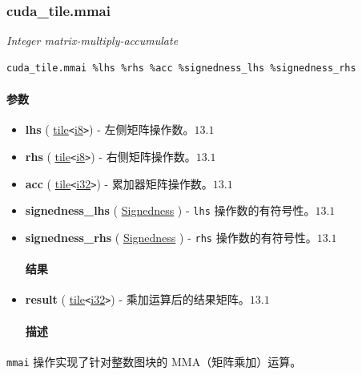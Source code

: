 \documentclass{article}
\begin{document}
\subsubsection{cuda\_tile.mmai}

\textit{Integer matrix-multiply-accumulate}


\begin{lstlisting}
cuda_tile.mmai %lhs %rhs %acc %signedness_lhs %signedness_rhs
\end{lstlisting}

\paragraph{参数}

\begin{itemize}
\item \textbf{lhs} ( \href{https://docs.nvidia.com/cuda/tile-ir/latest/sections/types.html#type-tile}{tile}\texttt{<}\href{https://docs.nvidia.com/cuda/tile-ir/latest/sections/types.html#subsection-element-types}{i8}\texttt{>}) - 左侧矩阵操作数。$\boxed{13.1}$
\item \textbf{rhs} ( \href{https://docs.nvidia.com/cuda/tile-ir/latest/sections/types.html#type-tile}{tile}\texttt{<}\href{https://docs.nvidia.com/cuda/tile-ir/latest/sections/types.html#subsection-element-types}{i8}\texttt{>}) - 右侧矩阵操作数。$\boxed{13.1}$
\item \textbf{acc} ( \href{https://docs.nvidia.com/cuda/tile-ir/latest/sections/types.html#type-tile}{tile}\texttt{<}\href{https://docs.nvidia.com/cuda/tile-ir/latest/sections/types.html#subsection-element-types}{i32}\texttt{>}) - 累加器矩阵操作数。$\boxed{13.1}$
\item \textbf{signedness\_lhs} ( \href{https://docs.nvidia.com/cuda/tile-ir/latest/sections/operations.html#op-attribute-cuda-tile-mmai-signedness-attr}{Signedness} ) - \texttt{lhs} 操作数的有符号性。$\boxed{13.1}$
\item \textbf{signedness\_rhs} ( \href{https://docs.nvidia.com/cuda/tile-ir/latest/sections/operations.html#op-attribute-cuda-tile-mmai-signedness-attr}{Signedness} ) - \texttt{rhs} 操作数的有符号性。$\boxed{13.1}$


\paragraph{结果}

\item \textbf{result} ( \href{https://docs.nvidia.com/cuda/tile-ir/latest/sections/types.html#type-tile}{tile}\texttt{<}\href{https://docs.nvidia.com/cuda/tile-ir/latest/sections/types.html#subsection-element-types}{i32}\texttt{>}) - 乘加运算后的结果矩阵。$\boxed{13.1}$


\paragraph{描述}

\end{itemize}
\texttt{mmai} 操作实现了针对整数图块的 MMA（矩阵乘加）运算。
\end{document}
